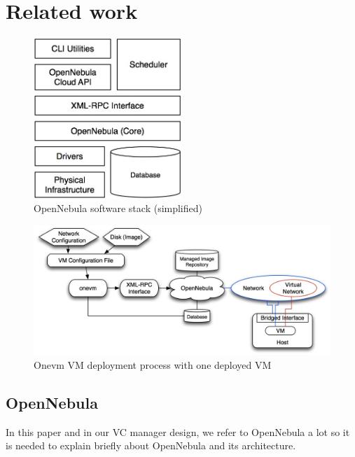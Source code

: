 \documentclass[conference]{IEEEtran}
\begin{document}

\section{Related work}

\begin{figure}[!t]
\centering
\includegraphics[width=2.2in]{onearch}
\caption{OpenNebula software stack (simplified)}
\label{fig:onearch}
\end{figure}

\begin{figure}[!t]
\centering
\includegraphics[width=6.5in]{onevm}
\caption{Onevm VM deployment process with one deployed VM}
\label{fig:onevm}
\end{figure}

\subsection{OpenNebula}
In this paper and in our VC manager design, we refer to OpenNebula a lot so it is needed to explain briefly about OpenNebula and its architecture.
\end{document}
